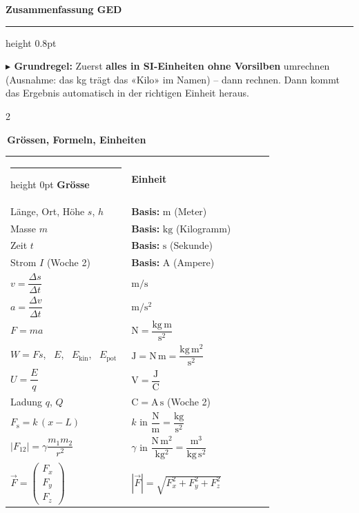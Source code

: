 \documentclass[8pt,a4paper]{extarticle}
\makeatletter
\newcommand{\T}[1]{%
  \vspace{2.2mm plus 0.6mm}%
  \noindent\colorbox{ak}{\color{white}\bfseries\small\,#1\,}\par
  \vspace{0.8mm}\nobreak\ignorespaces}
\newcommand{\FT}[1]{%
  \begin{tabular}{@{}>{\raggedright\arraybackslash}p{0.44\linewidth}@{\hspace{3pt}}>{\raggedright\arraybackslash}p{0.52\linewidth}@{}}
  #1\end{tabular}\par}
\newcommand{\hk}[1]{\textcolor{ak}{\textbf{#1}}}
\makeatother
\begin{document}
\begin{center}
{\large\bfseries Zusammenfassung GED}\\[0.3mm]
\end{center}
\vspace{-1.2mm}
\hrule height 0.8pt
\vspace{0.6mm}

{\small\color{ak}\textbf{$\blacktriangleright$ Grundregel:} Zuerst \textbf{alles in SI-Einheiten ohne Vorsilben} umrechnen (Ausnahme: das kg trägt das «Kilo» im Namen) – dann rechnen. Dann kommt das Ergebnis automatisch in der richtigen Einheit heraus.}

\vspace{1.2mm}
\begin{multicols}{2}

\T{Grössen, Formeln, Einheiten}

\FT{
\hrule height 0pt
\hk{Grösse} & \hk{Einheit} \\[0.4mm]
Länge, Ort, Höhe $s$, $h$ & \hk{Basis:} $\mathrm{m}$ (Meter) \\
Masse $m$ & \hk{Basis:} $\mathrm{kg}$ (Kilogramm) \\
Zeit $t$ & \hk{Basis:} $\mathrm{s}$ (Sekunde) \\
Strom $I$ (Woche 2) & \hk{Basis:} $\mathrm{A}$ (Ampere) \\[0.8mm]
$v = \dfrac{\Delta s}{\Delta t}$ & $\mathrm{m/s}$ \\
$a = \dfrac{\Delta v}{\Delta t}$ & $\mathrm{m/s^2}$ \\
$F = ma$ & $\mathrm{N} = \dfrac{\mathrm{kg\,m}}{\mathrm{s^2}}$ \\
$W = F s$, \ $E$, \ $E_{\text{kin}}$, \ $E_{\text{pot}}$ & $\mathrm{J} = \mathrm{N\,m} = \dfrac{\mathrm{kg\,m^2}}{\mathrm{s^2}}$ \\
$U = \dfrac{E}{q}$ & $\mathrm{V} = \dfrac{\mathrm{J}}{\mathrm{C}}$ \\
Ladung $q$, $Q$ & $\mathrm{C} = \mathrm{A\,s}$ (Woche 2) \\
$F_{\mathrm{s}} = k\,(x-L)$ & $k$ in $\dfrac{\mathrm{N}}{\mathrm{m}} = \dfrac{\mathrm{kg}}{\mathrm{s^2}}$ \\
$|F_{12}| = \gamma\dfrac{m_1m_2}{r^2}$ & $\gamma$ in $\dfrac{\mathrm{N\,m^2}}{\mathrm{kg^2}} = \dfrac{\mathrm{m^3}}{\mathrm{kg\,s^2}}$ \\[0.8mm]
$\vec F = \begin{pmatrix}F_x\\F_y\\F_z\end{pmatrix}$ & $|\vec F| = \sqrt{F_x^2+F_y^2+F_z^2}$ \\
}


\end{multicols}
\end{document}
